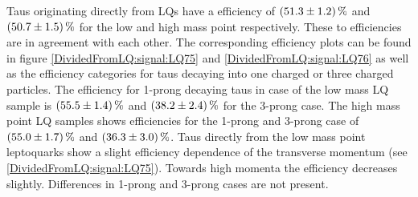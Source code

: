 %
Taus originating directly from LQs have a efficiency of $\SI{51.3\pm 1.2}{\percent}$ and $\SI{50.7\pm 1.5}{\percent}$ for the low and high mass point respectively. These to efficiencies are in agreement with each other. The corresponding efficiency plots can be found in figure \ref{DividedFromLQ:signal:LQ75} and \ref{DividedFromLQ:signal:LQ76} as well as the efficiency categories for taus decaying into one charged or three charged particles. The efficiency for 1-prong decaying taus in case of the low mass LQ sample is $\SI{55.5\pm 1.4}{\percent}$ and $\SI{38.2\pm 2.4}{\percent}$ for the 3-prong case. The high mass point LQ samples shows efficiencies for the 1-prong and 3-prong case of $\SI{55.0\pm 1.7}{\percent}$ and $\SI{36.3\pm 3.0}{\percent}$. Taus directly from the low mass point leptoquarks show a slight efficiency dependence of the transverse momentum (see \ref{DividedFromLQ:signal:LQ75}). Towards high momenta the efficiency decreases slightly. Differences in 1-prong and 3-prong cases are not present.\par
%
